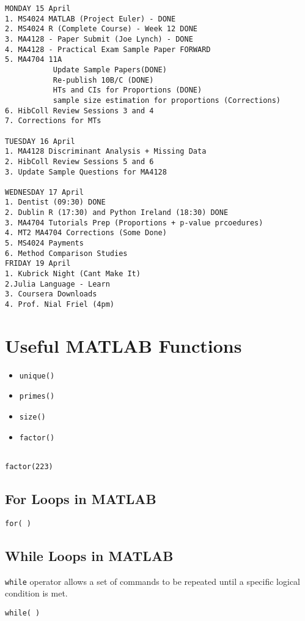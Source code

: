 \documentclass[12pt]{article} %
\begin{document}
\newpage
\newpage
\begin{verbatim}
MONDAY 15 April
1. MS4024 MATLAB (Project Euler) - DONE
2. MS4024 R (Complete Course) - Week 12 DONE
3. MA4128 - Paper Submit (Joe Lynch) - DONE
4. MA4128 - Practical Exam Sample Paper FORWARD
5. MA4704 11A
           Update Sample Papers(DONE)
           Re-publish 10B/C (DONE)
           HTs and CIs for Proportions (DONE)
           sample size estimation for proportions (Corrections)
6. HibColl Review Sessions 3 and 4
7. Corrections for MTs

TUESDAY 16 April
1. MA4128 Discriminant Analysis + Missing Data 
2. HibColl Review Sessions 5 and 6
3. Update Sample Questions for MA4128

WEDNESDAY 17 April
1. Dentist (09:30) DONE
2. Dublin R (17:30) and Python Ireland (18:30) DONE
3. MA4704 Tutorials Prep (Proportions + p-value prcoedures)
4. MT2 MA4704 Corrections (Some Done)
5. MS4024 Payments
6. Method Comparison Studies
FRIDAY 19 April
1. Kubrick Night (Cant Make It)
2.Julia Language - Learn
3. Coursera Downloads
4. Prof. Nial Friel (4pm)
\end{verbatim}
\newpage
\section{Useful MATLAB Functions}

\begin{itemize}
\item \texttt{unique()}
\item \texttt{primes()}
\item \texttt{size()}
\item \texttt{factor()}
\end{itemize}
\begin{framed}
\begin{verbatim}

factor(223)

\end{verbatim}
\end{framed}


\subsection{For Loops in MATLAB}
\begin{framed}
\begin{verbatim}
for( )

\end{verbatim}
\end{framed}
\subsection{While Loops in MATLAB}
\texttt{while} operator allows a set of commands to be repeated until a specific logical condition is met.

\begin{framed}
\begin{verbatim}
while( )

\end{verbatim}
\end{framed}
\end{document}
